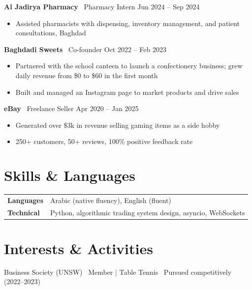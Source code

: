 \documentclass[11pt, a4paper]{article}
\newcommand{\role}[3]{%
  \textbf{#1} \textemdash\ #2 \hfill \textcolor{muted}{\small #3}%
}
\begin{document}
\medskip
\role{Al Jadirya Pharmacy}{Pharmacy Intern}{Jun 2024 -- Sep 2024}
\begin{itemize}
  \item Assisted pharmacists with dispensing, inventory management, and patient consultations, Baghdad
\end{itemize}

\medskip
\role{Baghdadi Sweets}{Co-founder}{Oct 2022 -- Feb 2023}
\begin{itemize}
  \item Partnered with the school canteen to launch a confectionery business; grew daily revenue from \$0 to \$60 in the first month
  \item Built and managed an Instagram page to market products and drive sales
\end{itemize}

\medskip
\role{eBay}{Freelance Seller}{Apr 2020 -- Jan 2025}
\begin{itemize}
  \item Generated over \$3k in revenue selling gaming items as a side hobby
  \item 250+ customers, 50+ reviews, 100\% positive feedback rate
\end{itemize}

\section{Skills \& Languages}

\begin{tabularx}{\textwidth}{@{}lX@{}}
  \textbf{Languages} & Arabic (native fluency), English (fluent) \\[3pt]
  \textbf{Technical}  & Python, algorithmic trading system design, asyncio, WebSockets \\
\end{tabularx}

\section{Interests \& Activities}

Business Society (UNSW) \textemdash\ Member
\quad|\quad
Table Tennis \textemdash\ Pursued competitively (2022--2023)
\end{document}
